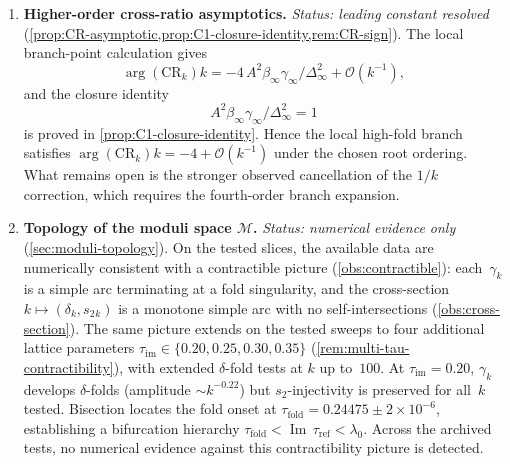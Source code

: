 \documentclass[11pt,a4paper]{article}
\theoremstyle{plain}
\theoremstyle{definition}
\theoremstyle{remark}
\DeclareMathOperator{\Real}{Re}
\DeclareMathOperator{\Imag}{Im}
\newcommand{\ii}{\mathrm{i}}
\newcommand{\Oo}{\mathcal{O}}
\begin{document}
\begin{enumerate}[label=\textbf{OP\arabic*.},nosep]
  \emph{Status: open, with a conjectural organizing relation}
  (\cref{conj:tau-spec}).
  The spectral modular parameter
  $\tau_{\mathrm{spec}} = -\tfrac12 + \ii\ln(4k)/\pi
  - \ii/(8\pi k^2) + \Oo(k^{-4})$
  is the strongest conjectural bridge presently available: it suggests,
  but does not yet prove, that $k$ is encoded in the conformal type of
  the spectral curve via \eqref{eq:tau-spec}, and that the elliptic
  lambda function is numerically matched by an anharmonic transform of
  the branch-point cross-ratio.
  The real part $\Real\,\tau_{\mathrm{spec}} = -1/2$ is
  accounted for conditionally in \cref{prop:tau-univ}.
  The factorization $A^2 = F_{\mathrm{loc}} \times
  F_{\mathrm{glob}}$ (\cref{eq:A2-formula}) mirrors
  Gavrylenko--Lisovyy $\tau$-function
  expansions~\cite{GL18,GIL12}.
  What remains open is the \emph{connection constant}~$C_0$
  in~\eqref{eq:jimbo-log}: it is conjectured
  (\cref{conj:C0}) but not numerically extractable due to
  the logarithmic degeneracy of the unipotent PVI
  asymptotics.

\item \textbf{Higher-order cross-ratio asymptotics.}
  \emph{Status: leading constant resolved}
  (\cref{prop:CR-asymptotic,prop:C1-closure-identity,rem:CR-sign}).
  The local branch-point calculation gives
  \[
    \arg(\mathrm{CR}_k)k
    =
    -4\,A^2\beta_\infty\gamma_\infty/\Delta_\infty^2
    +\Oo(k^{-1}),
  \]
  and the closure identity
  \[
    A^2\beta_\infty\gamma_\infty/\Delta_\infty^2=1
  \]
  is proved in \cref{prop:C1-closure-identity}.  Hence the local
  high-fold branch satisfies
  $\arg(\mathrm{CR}_k)k=-4+\Oo(k^{-1})$ under the chosen root ordering.
  What remains open is the stronger observed cancellation of the
  $1/k$ correction, which requires the fourth-order branch expansion.

\item \textbf{Topology of the moduli space $\mathcal{M}$.}
  \emph{Status: numerical evidence only} (\cref{sec:moduli-topology}).
  On the tested slices, the available data are numerically consistent
  with a contractible picture (\cref{obs:contractible}): each~$\gamma_k$
  is a simple arc terminating at a fold singularity, and the cross-section
  $k \mapsto (\delta_k, s_2{}_k)$ is a monotone simple arc
  with no self-intersections (\cref{obs:cross-section}).
  The same picture extends on the tested sweeps to four additional lattice
  parameters $\tau_{\mathrm{im}} \in \{0.20, 0.25, 0.30, 0.35\}$
  (\cref{rem:multi-tau-contractibility}), with extended
  $\delta$-fold tests at $k$ up to~$100$.
  At $\tau_{\mathrm{im}} = 0.20$, $\gamma_k$ develops
  $\delta$-folds (amplitude $\sim k^{-0.22}$) but
  $s_2$-injectivity is preserved for all~$k$ tested.
  Bisection locates the fold onset at
  $\tau_{\mathrm{fold}} = 0.24475 \pm 2 \times 10^{-6}$,
  establishing a bifurcation hierarchy
  $\tau_{\mathrm{fold}} < \Imag\,\tau_{\mathrm{ref}} < \lambda_0$.
  Across the archived tests, no numerical evidence against this
  contractibility picture is detected.


\end{enumerate}
\end{document}
